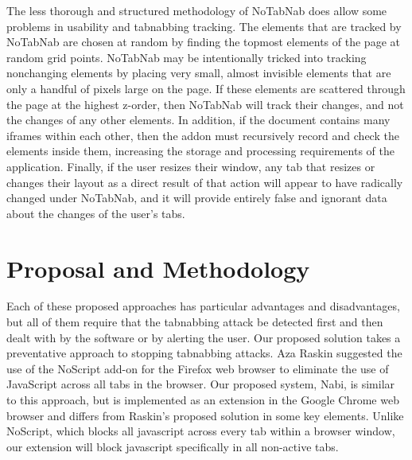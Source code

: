 \documentclass[12pt]{article}
\begin{document}
\begin{doublespace}
The less thorough and structured methodology of NoTabNab does allow some problems in usability and tabnabbing tracking.  The elements that are tracked by NoTabNab are chosen at random by finding the topmost elements of the page at random grid points.  NoTabNab may be intentionally tricked into tracking nonchanging elements by placing very small, almost invisible elements that are only a handful of pixels large on the page.  If these elements are scattered through the page at the highest z-order, then NoTabNab will track their changes, and not the changes of any other elements.  In addition, if the document contains many iframes within each other, then the addon must recursively record and check the elements inside them, increasing the storage and processing requirements of the application.  Finally, if the user resizes their window, any tab that resizes or changes their layout as a direct result of that action will appear to have radically changed under NoTabNab, and it will provide entirely false and ignorant data about the changes of the user's tabs.

\section{Proposal and Methodology}
\begin{comment}
Each of these approaches has advantages and disadvantages, but one particular disadvantage all these methods possess is that they are all only detection programs. We believe that a preventative method is a more effective way to combat tabnabbing.
We propose a web browser extension to prevent attackers from executing their tabnabbing attacks. Aza Raskin suggested the use of the NoScript add-on for the Firefox web browser to eliminate the use of JavaScript across all tabs in the browser.  Our proposed system is similar to this approach, but is implemented in the Google Chrome web browser and differs from Raskin’s proposed solution in some key elements. Unlike NoScript, which blocks all javascript across every tab within a browser window, our extension will block javascript specifically in all non-active tabs that are not part of a trusted whitelist.  
\end{comment}
Each of these proposed approaches has particular advantages and disadvantages, but all of them require that the tabnabbing attack be detected first and then dealt with by the software or by alerting the user. Our proposed solution takes a preventative approach to stopping tabnabbing attacks. Aza Raskin suggested the use of the NoScript add-on for the Firefox web browser to eliminate the use of JavaScript across all tabs in the browser. Our proposed system, Nabi, is similar to this approach, but is implemented as an extension in the Google Chrome web browser and differs from Raskin’s proposed solution in some key elements. Unlike NoScript, which blocks all javascript across every tab within a browser window, our extension will block javascript specifically in all non-active tabs.


\end{doublespace}
\end{document}
